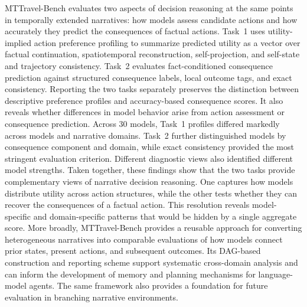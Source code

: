 \documentclass[pdflatex,sn-mathphys-num]{sn-jnl}%
\theoremstyle{thmstyleone}%
\theoremstyle{thmstyletwo}%
\theoremstyle{thmstylethree}%
\begin{document}
MTTravel-Bench evaluates two aspects of decision reasoning at the same points in temporally extended narratives: how models assess candidate actions and how accurately they predict the consequences of factual actions. Task~1 uses utility-implied action preference profiling to summarize predicted utility as a vector over factual continuation, spatiotemporal reconstruction, self-projection, and self-state and trajectory consistency. Task~2 evaluates fact-conditioned consequence prediction against structured consequence labels, local outcome tags, and exact consistency. Reporting the two tasks separately preserves the distinction between descriptive preference profiles and accuracy-based consequence scores. It also reveals whether differences in model behavior arise from action assessment or consequence prediction.
Across 30 models, Task~1 profiles differed markedly across models and narrative domains. Task~2 further distinguished models by consequence component and domain, while exact consistency provided the most stringent evaluation criterion. Different diagnostic views also identified different model strengths. Taken together, these findings show that the two tasks provide complementary views of narrative decision reasoning. One captures how models distribute utility across action structures, while the other tests whether they can recover the consequences of a factual action. This resolution reveals model-specific and domain-specific patterns that would be hidden by a single aggregate score.
More broadly, MTTravel-Bench provides a reusable approach for converting heterogeneous narratives into comparable evaluations of how models connect prior states, present actions, and subsequent outcomes. Its DAG-based construction and reporting scheme support systematic cross-domain analysis and can inform the development of memory and planning mechanisms for language-model agents. The same framework also provides a foundation for future evaluation in branching narrative environments.
\end{document}
